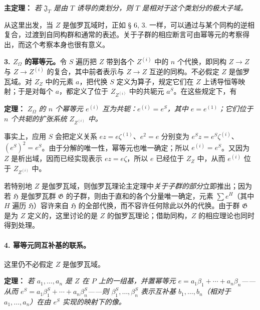 \documentclass[11pt]{article}
\providecommand{\srcspaced}[1]{#1}
\providecommand{\Gcal}{\mathfrak G}
\begin{document}
\noindent\textbf{\srcspaced{主定理：}} \emph{若 \(\mathfrak J_T\) 是由 \(T\) 诱导的类划分，则 \(T\) 是相对于这个类划分的极大子域。}

从这里出发，当 \(Z\) 是伽罗瓦域时，正如 § 6, 3. 一样，可以通过与某个同构的逆相复合，过渡到自同构群和通常的表述。关于子群的相应断言可由幂等元的考察得出，而这个考察本身也很有意义。

\medskip
\noindent\textbf{\srcspaced{3. \(Z_\Omega\) 的幂等元。}}\quad 令 \(S\) 遍历把 \(Z\) 带到各个 \(Z^{(i)}\) 中的 \(n\) 个代换，即同构 \(Z\to Z\) 与 \(Z\to Z^{(i)}\) 的复合，其中前者表示与 \(Z\to Z\) 互逆的同构。不必假定 \(Z\) 是伽罗瓦域。对 \(Z_Z\) 中的元素 \(a\)，把代换 \(S\) 定义为算子，规定它们在 \(Z\) 上诱导恒等映射；于是对每个 \(a\)，都定义了位于 \(Z_{Z^{(i)}}\) 中的共轭元 \(a^S\)。在这些规定下，有

\noindent\textbf{\srcspaced{定理：}} \emph{\(Z_\Omega\) 的 \(n\) 个幂等元 \(e^{(i)}\) 互为共轭：\(e^{(i)}=e^S\)，其中 \(e=e^{(1)}\)；它们位于 \(n\) 个共轭的扩张系统 \(Z_{Z^{(i)}}\) 中。}

事实上，应用 \(S\) 会把定义关系 \(ez=e\zeta^{(1)}\)、\(e^2=e\) 分别变为 \(e^Sz=e^S\zeta^{(i)}\)、\((e^S)^2=e^S\)。由于分解的唯一性，幂等元也唯一确定；所以 \(e^{(i)}=e^S\)。又因为 \(Z\) 是析出域，因而已经实现表示 \(ez=e\zeta\)，所以 \(e\) 已经位于 \(Z_Z\) 中，从而 \(e^{(i)}\) 位于 \(Z_{Z^{(i)}}\) 中。

若特别地 \(Z\) 是伽罗瓦域，则伽罗瓦理论主定理中\emph{关于子群的部分}立即推出；因为若 \(\mathfrak H\) 是伽罗瓦群 \(\Gcal\) 的子群，则由于直和的各个分量唯一确定，元素 \(\sum e^H\)（其中 \(H\) 遍历 \(\mathfrak H\)）容许来自 \(\mathfrak H\) 的全部代换，而不容许任何除此以外的代换。由于群 \(\Gcal\) 是为 \(Z\) 定义的，这里讨论的是 \(Z\) 的伽罗瓦理论；借助同构，\(Z\) 的相应理论也同时得到处理。

\paragraph{4. 幂等元同互补基的联系。}
这里仍不必假定 \(Z\) 是伽罗瓦域。

\noindent\textbf{\srcspaced{定理：}} \emph{若 \(a_1,\ldots,a_n\) 是 \(Z\) 在 \(P\) 上的一组基，并置幂等元 \(e=a_1\beta_1+\cdots+a_n\beta_n\)——从而 \(e^S=a_1\beta_1^S+\cdots+a_n\beta_n^S\)——则 \(\beta_1^S,\ldots,\beta_n^S\) 表示互补基 \(b_1,\ldots,b_n\)（相对于 \(a_1,\ldots,a_n\)）在由 \(e^S\) 实现的映射下的像。}
\end{document}
